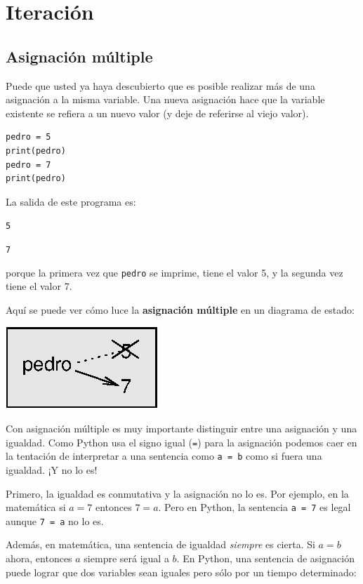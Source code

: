 
\chapter{Iteración }


\section{Asignación múltiple}

  

Puede que usted ya haya descubierto que es posible realizar más de
una asignación a la misma variable. Una nueva asignación hace que
la variable existente se refiera a un nuevo valor (y deje de referirse
al viejo valor).

\begin{verbatim}
pedro = 5
print(pedro)
pedro = 7
print(pedro)
\end{verbatim}
 La salida de este programa es:

\texttt{5 }

\texttt{7} 

porque la primera vez que \texttt{pedro} se imprime, tiene el valor
5, y la segunda vez tiene el valor 7.

Aquí se puede ver cómo luce la \textbf{asignación múltiple } en un
diagrama de estado:

\beforefig \centerline{\includegraphics{illustrations/assign2}}
\afterfig

Con asignación múltiple es muy importante distinguir entre una asignación
y una igualdad. Como Python usa el signo igual (\texttt{=}) para la
asignación podemos caer en la tentación de interpretar a una sentencia
como \texttt{a = b} como si fuera una igualdad. ¡Y no lo es!

Primero, la igualdad es conmutativa y la asignación no lo es. Por
ejemplo, en la matemática si $a=7$ entonces $7=a$. Pero en Python,
la sentencia \texttt{a = 7} es legal aunque \texttt{7 = a} no lo es.

Además, en matemática, una sentencia de igualdad \textit{siempre}
es cierta. Si $a=b$ ahora, entonces $a$ siempre será igual a $b$.
En Python, una sentencia de asignación puede lograr que dos variables
sean iguales pero sólo por un tiempo determinado:

